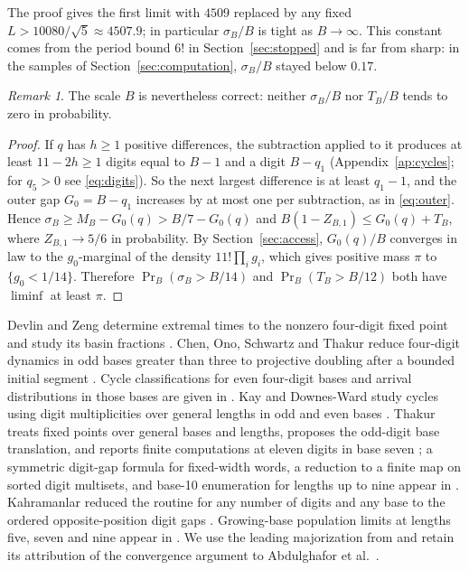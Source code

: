\documentclass[11pt,reqno]{amsart}
\theoremstyle{remark}
\newtheorem*{remark}{Remark}
\begin{document}
The proof gives the first limit with \(4509\) replaced by any fixed \(L>10080/\sqrt5\approx4507.9\); in particular \(\sigma_B/B\) is tight as \(B\to\infty\). This constant comes from the period bound \(6!\) in Section~\ref{sec:stopped} and is far from sharp: in the samples of Section~\ref{sec:computation}, \(\sigma_B/B\) stayed below \(0.17\).

\begin{remark}
The scale \(B\) is nevertheless correct: neither \(\sigma_B/B\) nor \(T_B/B\) tends to zero in probability.
\end{remark}
\begin{proof}
If \(q\) has \(h\ge1\) positive differences, the subtraction applied to it produces at least \(11-2h\ge1\) digits equal to \(B-1\) and a digit \(B-q_1\) (Appendix~\ref{ap:cycles}; for \(q_5>0\) see \eqref{eq:digits}). So the next largest difference is at least \(q_1-1\), and the outer gap \(G_0=B-q_1\) increases by at most one per subtraction, as in \eqref{eq:outer}. Hence \(\sigma_B\ge M_B-G_0(q)>B/7-G_0(q)\) and \(B(1-Z_{B,1})\le G_0(q)+T_B\), where \(Z_{B,1}\to5/6\) in probability. By Section~\ref{sec:access}, \(G_0(q)/B\) converges in law to the \(g_0\)-marginal of the density \(11!\prod_ig_i\), which gives positive mass \(\pi\) to \(\{g_0<1/14\}\). Therefore \(\Pr_B(\sigma_B>B/14)\) and \(\Pr_B(T_B>B/12)\) both have \(\liminf\) at least \(\pi\).
\end{proof}

Devlin and Zeng determine extremal times to the nonzero four-digit fixed point and study its basin fractions \cite[Theorems 1 and 2]{DZ}. Chen, Ono, Schwartz and Thakur reduce four-digit dynamics in odd bases greater than three to projective doubling after a bounded initial segment \cite[Theorem 1]{COST}. Cycle classifications for even four-digit bases and arrival distributions in those bases are given in \cite{G1,G2}. Kay and Downes-Ward study cycles using digit multiplicities over general lengths in odd and even bases \cite{KDO,KDE}. Thakur treats fixed points over general bases and lengths, proposes the odd-digit base translation, and reports finite computations at eleven digits in base seven \cite[Sections 4 and 5.4]{Thakur}; a symmetric digit-gap formula for fixed-width words, a reduction to a finite map on sorted digit multisets, and base-10 enumeration for lengths up to nine appear in \cite{NS}. Kahramanlar reduced the routine for any number of digits and any base to the ordered opposite-position digit gaps \cite[\S2]{Kah}. Growing-base population limits at lengths five, seven and nine appear in \cite{G3,G5,G4}. We use the leading majorization from \cite[Theorem 1]{G4} and retain its attribution of the convergence argument to Abdulghafor et al.\ \cite[Theorem 3.3 and Remark 3.4]{ASO}.
\end{document}
